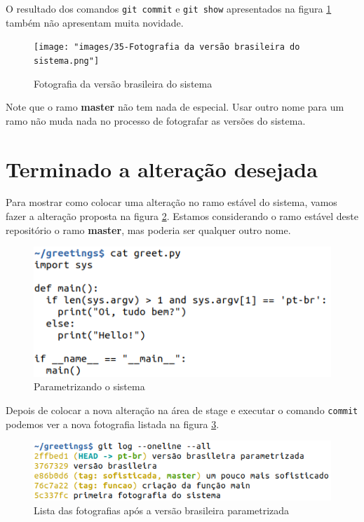 \documentclass[a4paper]{book}
\begin{document}
O resultado dos comandos \texttt{git commit} 
e \texttt{git show} apresentados na
figura \ref{fig:35} também não apresentam muita novidade.

\begin{figure}[h!]
\caption{Fotografia da versão brasileira do sistema}
\label{fig:35}
\centering
\texttt{[image: "images/35-Fotografia da versão brasileira do sistema.png"]}
\end{figure}

Note que o ramo \textbf{master} não tem nada de especial.
Usar outro nome para um ramo não muda nada no processo
de fotografar as versões do sistema.

\newpage
\section{Terminado a alteração desejada}

Para mostrar como colocar uma alteração no ramo estável do
sistema, vamos fazer a alteração proposta na 
figura \ref{fig:36}.
Estamos considerando o ramo estável deste repositório
o ramo \textbf{master}, mas poderia ser qualquer outro nome.

\begin{figure}[ht]
\caption{Parametrizando o sistema}
\label{fig:36}
\centering
\includegraphics[scale=0.6]{"images/36-Parametrizando o sistema.png"}
\end{figure}

Depois de colocar a nova alteração na área de stage
e executar o comando \texttt{commit} podemos ver a nova 
fotografia listada na figura \ref{fig:38}.

\begin{figure}[ht]
\caption{Lista das fotografias após a versão brasileira parametrizada}
\label{fig:38}
\centering
\includegraphics[scale=0.6]{"images/38-Lista das fotografias após a versão brasileira parametrizada.png"}
\end{figure}
\end{document}
